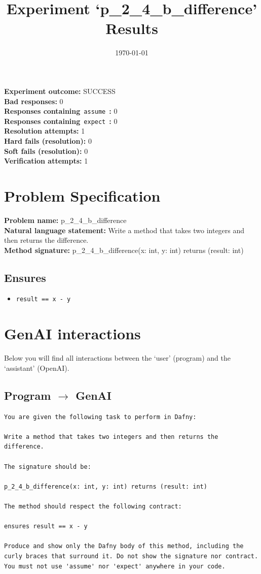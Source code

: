 \documentclass{article}
\begin{document}
\title{Experiment `p\_2\_4\_b\_difference' Results}
\author{\today}
\date{}
\maketitle
\textbf{Experiment outcome: }SUCCESS
\\\textbf{Bad responses: }0
\\\textbf{Responses containing}~\texttt{assume}~\textbf{: }0
\\\textbf{Responses containing}~\texttt{expect}~\textbf{: }0
\\\textbf{Resolution attempts: }1
\\\textbf{Hard fails (resolution): }0
\\\textbf{Soft fails (resolution): }0
\\\textbf{Verification attempts: }1
\section*{Problem Specification}
\textbf{Problem name: }p\_2\_4\_b\_difference
\\\textbf{Natural language statement: }Write a method that takes two integers and then returns the difference.
\\\textbf{Method signature: }p\_2\_4\_b\_difference(x: int, y: int) returns (result: int)
\subsection*{Ensures}
\begin{itemize}
\item \texttt{result == x - y}
\end{itemize}
\clearpage
\section*{GenAI interactions}
Below you will find all interactions between the `user' (program) and the `assistant' (OpenAI).
\subsection*{Program $\rightarrow$ GenAI}
\begin{lstlisting}
You are given the following task to perform in Dafny:

Write a method that takes two integers and then returns the difference.

The signature should be:

p_2_4_b_difference(x: int, y: int) returns (result: int)

The method should respect the following contract:

ensures result == x - y

Produce and show only the Dafny body of this method, including the curly braces that surround it. Do not show the signature nor contract. You must not use 'assume' nor 'expect' anywhere in your code.
\end{lstlisting}
\end{document}

